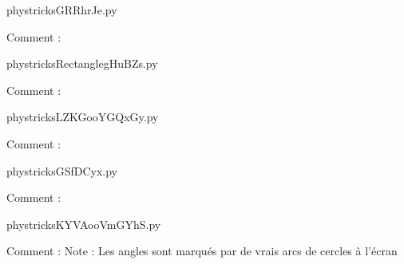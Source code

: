 
    \newcommand{\CaptionFigGRRhrJe}{<+Type your caption here+>}
    \begin{center}
        
    \end{center}
    phystricksGRRhrJe.py

    Comment : 

    \clearpage
    


    \newcommand{\CaptionFigRectanglegHuBZs}{<+Type your caption here+>}
    \begin{center}
        
    \end{center}
    phystricksRectanglegHuBZs.py

    Comment : 

    \clearpage
    


    \newcommand{\CaptionFigLZKGooYGQxGy}{<+Type your caption here+>}
    \begin{center}
        
    \end{center}
    phystricksLZKGooYGQxGy.py

    Comment : 

    \clearpage
    


    \newcommand{\CaptionFigGSfDCyx}{<+Type your caption here+>}
    \begin{center}
        
    \end{center}
    phystricksGSfDCyx.py

    Comment : 

    \clearpage
    


    \newcommand{\CaptionFigKYVAooVmGYhS}{<+Type your caption here+>}
    \begin{center}
        
    \end{center}
    phystricksKYVAooVmGYhS.py

    Comment : Note : Les angles sont marqués par de vrais arcs de cercles à l'écran

    \clearpage
    


